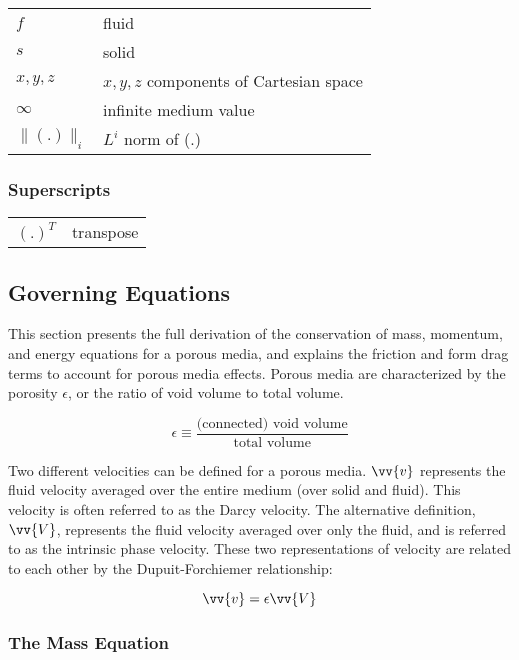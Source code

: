\documentclass[10pt]{article}
\numberwithin{equation}{section} %
\begin{document}
\begin{tabular}{l l}
\(f\) & fluid\\
\(s\) & solid\\
\(x, y, z\) & \(x, y, z\) components of Cartesian space\\
\(\infty\) & infinite medium value\\
\(\|(.)\|_i\) & \(L^i\) norm of (.)\\
\end{tabular}

\subsubsection{Superscripts}

\begin{tabular}{l l}
\((.)^T\)	& transpose\\
\end{tabular}


\subsection{Governing Equations}
\label{sec:GoverningEquations}

This section presents the full derivation of the conservation of mass, momentum, and energy equations for a porous media, and explains the friction and form drag terms to account for porous media effects. Porous media are characterized by the porosity \(\epsilon\), or the ratio of void volume to total volume.

\begin{equation}
\label{eq:PorosityDefinition}
\epsilon\equiv\frac{\textrm{(connected) void volume}}{\textrm{total volume}}
\end{equation}

Two different velocities can be defined for a porous media. \(\vv{v}\) represents the fluid velocity averaged over the entire medium (over solid and fluid). This velocity is often referred to as the Darcy velocity. The alternative definition, \(\vv{V}\), represents the fluid velocity averaged over only the fluid, and is referred to as the intrinsic phase velocity. These two representations of velocity are related to each other by the Dupuit-Forchiemer relationship:

\begin{equation}
\label{eq:DupuitForchiemer}
\vv{v}=\epsilon\vv{V}
\end{equation}

\subsubsection{The Mass Equation}
\label{sec:ContinuityEqnPebbleBed}
\end{document}

